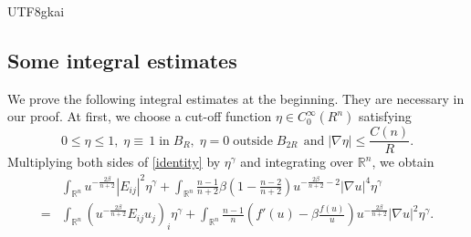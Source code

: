 \documentclass[reqno,12pt]{amsart}
\newcommand{\text}{\mbox}
\numberwithin{equation}{section}
\newcommand{\bR}{{\mathbb R}}  %
\begin{document}
\begin{CJK}{UTF8}{gkai}
   \subsection{Some integral estimates} We prove the following integral estimates at the beginning. They are necessary in our proof. 
   At first, we choose a cut-off function $\eta\in C^{\infty}_{0}(R^{n})$ satisfying 
  \begin{equation*}
  	 0\le\eta\le 1,\; \eta\equiv\,1\;\text{in}\;B_{R},\; \eta=0 \;\text{outside}\; B_{2R}\;\,\text{and}\;|\nabla \eta|\le \frac{C(n)}{R}.
  \end{equation*}
  Multiplying both sides of \eqref{identity} by $\eta^{\gamma}$ and integrating over $\bR^{n}$, we obtain
  \begin{equation}\label{indentity for RN}
  	\begin{aligned}
  &\int_{\bR^{n}}u^{-\frac{2\beta}{n+2}}|E_{ij}|^{2}\eta^{\gamma}+\int_{\bR^{n}}\frac{n-1}{n+2}\beta\left(1-\frac{n-2}{n+2}\right)u^{-\frac{2\beta}{n+2}-2}|\nabla u|^{4}\eta^{\gamma}\\
  =&\int_{\bR^{n}}\left(u^{-\frac{2\beta}{n+2}}E_{ij}u_{j}\right)_{i}\eta^{\gamma}+\int_{\bR^{n}}\frac{n-1}{n}\left(f'(u)-\beta\frac{f(u)}{u}\right)u^{-\frac{2\beta}{n+2}}|\nabla u|^{2}\eta^{\gamma}.
  	\end{aligned}
  \end{equation}
  

\end{CJK}
\end{document}
